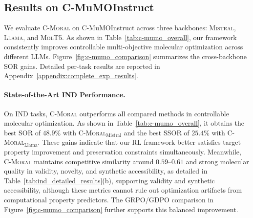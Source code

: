 \documentclass[11pt]{article}
\begin{document}
\subsection{Results on C-MuMOInstruct}
\label{subsec:main_results}

We evaluate \textsc{C-Moral} on C-MuMOInstruct across three backbones: \textsc{Mistral}, \textsc{Llama}, and \textsc{MolT5}. As shown in Table~\ref{tab:c-mumo_overall}, our framework consistently improves controllable multi-objective molecular optimization across different LLMs. Figure~\ref{fig:c-mumo_comparison} summarizes the cross-backbone SOR gains. Detailed per-task results are reported in Appendix~\ref{appendix:complete_exp_results}.

\paragraph{State-of-the-Art IND Performance.}
On IND tasks, \textsc{C-Moral} outperforms all compared methods in controllable molecular optimization. As shown in Table~\ref{tab:c-mumo_overall}, it obtains the best SOR of \textbf{$48.9\%$} with \textsc{C-Moral}$_{\mathrm{Mistral}}$ and the best SSOR of \textbf{$25.4\%$} with \textsc{C-Moral}$_{\mathrm{Llama}}$. These gains indicate that our RL framework better satisfies target property improvement and preservation constraints simultaneously. Meanwhile, \textsc{C-Moral} maintains competitive similarity around $0.59$--$0.61$ and strong molecular quality in validity, novelty, and synthetic accessibility, as detailed in Table~\ref{tab:ind_detailed_results}(b), supporting validity and synthetic accessibility, although these metrics cannot rule out optimization artifacts from computational property predictors. The GRPO/GDPO comparison in Figure~\ref{fig:c-mumo_comparison} further supports this balanced improvement.
\end{document}
